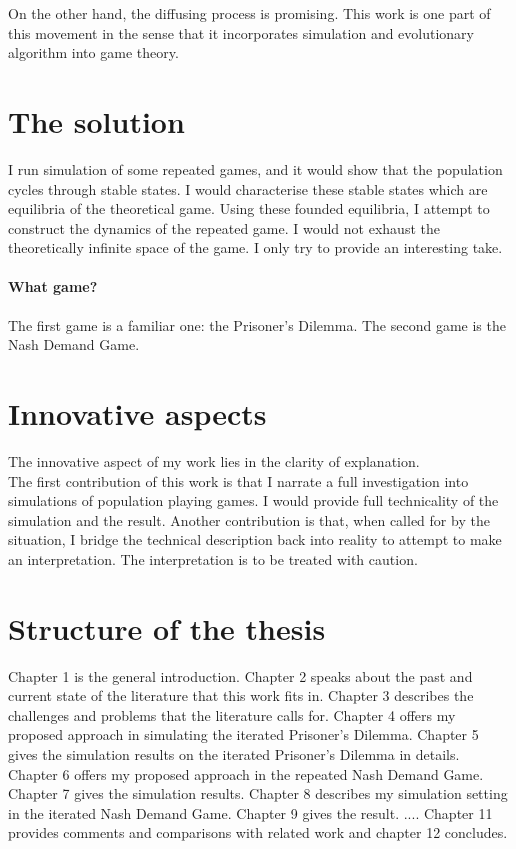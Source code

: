 \documentclass[12.5pt]{report}
\begin{document}
On the other hand, the diffusing process is promising. This work is one part of this movement in the sense that it incorporates simulation and evolutionary algorithm into game theory.

\section{The solution}
I run simulation of some repeated games, and it would show that the population cycles through stable states. I would characterise these stable states which are equilibria of the theoretical game. Using these founded equilibria, I attempt to construct the dynamics of the repeated game. I would not exhaust the theoretically infinite space of the game. I only try to provide an interesting take.

\paragraph{What game?}
The first game is a familiar one: the Prisoner's Dilemma. The second game is the Nash Demand Game.

\section{Innovative aspects}
The innovative aspect of my work lies in the clarity of explanation.\\

The first contribution of this work is that I narrate a full investigation into simulations of population playing games. I would provide full technicality of the simulation and the result. Another contribution is that, when called for by the situation, I bridge the technical description back into reality to attempt to make an interpretation. The interpretation is to be treated with caution.\\

\section{Structure of the thesis}
Chapter 1 is the general introduction. Chapter 2 speaks about the past and current state of the literature that this work fits in. Chapter 3 describes the challenges and problems that the literature calls for. Chapter 4 offers my proposed approach in simulating the iterated Prisoner's Dilemma. Chapter 5 gives the simulation results on the iterated Prisoner's Dilemma in details. Chapter 6 offers my proposed approach in the repeated Nash Demand Game. Chapter 7 gives the simulation results. Chapter 8 describes my simulation setting in the iterated Nash Demand Game. Chapter 9 gives the result.  .... Chapter 11 provides comments and comparisons with related work and chapter 12 concludes. 
\end{document}
